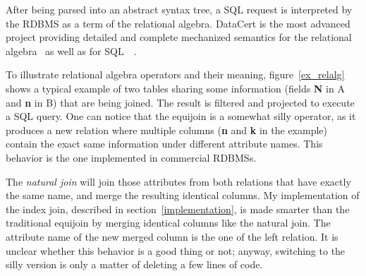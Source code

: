\documentclass[11pt]{article}
\begin{document}
After being parsed into an abstract syntax tree, a SQL request is interpreted by the RDBMS as a term of the relational algebra.
DataCert is the most advanced project providing detailed and complete mechanized semantics for the relational algebra~\cite{CFRDM}
as well as for SQL~\cite{CMFSRSQ}~\cite{CFSEE}.

To illustrate relational algebra operators and their meaning, figure~\ref{ex_relalg} shows a typical example
of two tables sharing some information (fields \textbf{N} in A and \textbf{n} in B) that are being joined.
The result is filtered and projected to execute a SQL query.
One can notice that the equijoin is a somewhat silly operator, as it produces a new relation where multiple columns (\textbf{n} and \textbf{k} in the example) contain the exact same information under different attribute names.
This behavior is the one implemented in commercial RDBMSs.

The \emph{natural join} will join those attributes from both relations that have exactly the same name, and merge the resulting identical columns.
My implementation of the index join, described in section~\ref{implementation}, is made smarter than the traditional equijoin by merging identical columns like the natural join.
The attribute name of the new merged column is the one of the left relation.
It is unclear whether this behavior is a good thing or not; anyway, switching to the silly version is only a matter of deleting a few lines of code.
\end{document}
